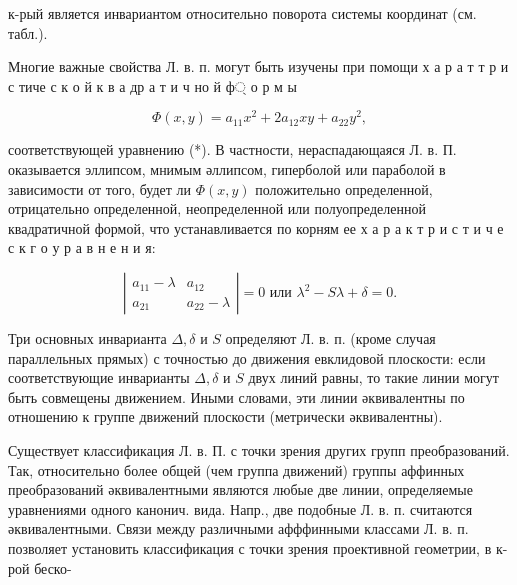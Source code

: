 \documentclass[10pt]{article}
\begin{document}
к-рый является инвариантом относительно поворота системы координат (см. табл.).



Многие важные свойства Л. в. п. могут быть изучены при помощи х а р а т т р и с тиче с к о й к в а др а т и ч но й ф্ $о$ р м ы



\[

\Phi(x, y)=a_{11} x^{2}+2 a_{12} x y+a_{22} y^{2},

\]



соответствующей уравнению (*). В частности, нераспадающаяся Л. в. П. оказывается эллипсом, мнимым әллипсом, гиперболой или параболой в зависимости от того, будет ли $\Phi(x, y)$ положительно определенной, отрицательно определенной, неопределенной или полуопределенной квадратичной формой, что устанавливается по корням ее х а р а к т р и с т и ч е с к г о у р а в н е н и я:



\[

\left|\begin{array}{cc}

a_{11}-\lambda & a_{12} \\

a_{21} & a_{22}-\lambda

\end{array}\right|=0 \text { или } \lambda^{2}-S \lambda+\delta=0 .

\]



Три основных инварианта $\Delta, \delta$ и $S$ определяют Л. в. п. (кроме случая параллельных прямых) с точностью до движения евклидовой плоскости: если соответствующие инварианты $\Delta, \delta$ и $S$ двух линий равны, то такие линии могут быть совмещены движением. Иными словами, эти линии әквивалентны по отношению к группе движений плоскости (метрически әквивалентны).



Существует классификация Л. в. П. с точки зрения других групп преобразований. Так, относительно более общей (чем группа движений) группы аффинных преобразований әквивалентными являются любые две линии, определяемые уравнениями одного канонич. вида. Напр., две подобные Л. в. п. считаются әквивалентными. Связи между различными афффинными классами Л. в. п. позволяет установить классификация с точки зрения проективной геометрии, в к-рой беско-
\end{document}
